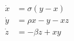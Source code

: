$\begin{align}\dot{x} & = \sigma(y-x) \\\dot{y} & = \rho x - y - xz \\\dot{z} & = -\beta z + xy\end{align}$